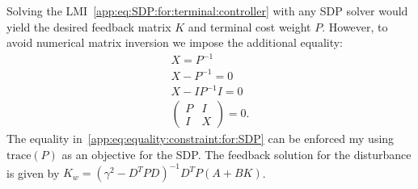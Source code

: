 %
Solving the LMI~\eqref{app:eq:SDP:for:terminal:controller} with any SDP solver 
would yield the desired feedback matrix $K$ and terminal cost weight $P$. However,
to avoid numerical matrix inversion we impose the additional equality:
%
\begin{equation}\label{app:eq:equality:constraint:for:SDP}\begin{split}
	X = P^{-1}\\
	X - P^{-1} = 0 \\
	X - IP^{-1}I = 0 \\
	\left(\begin{array}{cc}
	P & I \\ I & X
	\end{array}\right) = 0.
\end{split}\end{equation}
%
The equality in~\eqref{app:eq:equality:constraint:for:SDP} can be enforced my using
$\text{trace}(P)$ as an objective for the SDP.
The feedback solution for the disturbance is given by $K_w = (\gamma^2-D^T P D)^{-1}D^T P (A+BK)$.